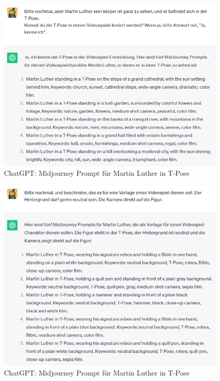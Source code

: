 \documentclass[10pt,a4paper,bibliography=totocnumbered,listof=totocnumbered]{scrartcl}
\begin{document}
\begin{figure}
	\centering
	\includegraphics[scale=0.7]{BilderFuerBA/CGPTMidJourneyMartinLuther/09.png}
	\caption{ChatGPT: Midjourney Prompt für Martin Luther in T-Pose}
	\label{chatgptMartinLutherMJinTPose}
\end{figure}

\begin{figure}
	\centering
	\includegraphics[scale=0.7]{BilderFuerBA/CGPTMidJourneyMartinLuther/10.png}
	\caption{ChatGPT: Midjourney Prompt für Martin Luther in T-Pose}
	\label{chatgptMartinLutherMJmitNeutralenHintergrund}
\end{figure}
\end{document}
